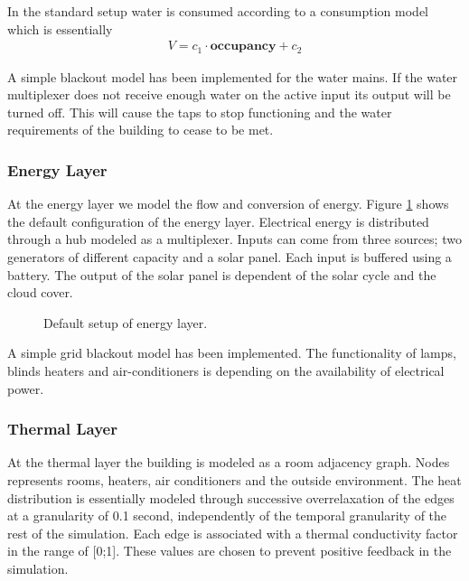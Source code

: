 \documentclass[10pt]{article}
\newcommand{\includeSVG}[1]{
  \texttt{[image: figs/\#1.pdf]}
}
\begin{document}
In the standard setup water is consumed according to a consumption model which is essentially
\begin{eqnarray}
  \nonumber V = c_1 \cdot \mathbf{occupancy} + c_2
\end{eqnarray}

A simple blackout model has been implemented for the water mains. If the water multiplexer does not receive enough water on the active input its output will be turned off. This will cause the taps to stop functioning and the water requirements of the building to cease to be met.

\subsubsection{Energy Layer}

At the energy layer we model the flow and conversion of energy. Figure \ref{fig:energy} shows the default configuration of the energy layer. Electrical energy is distributed through a hub modeled as a multiplexer. Inputs can come from three sources; two generators of different capacity and a solar panel. Each input is buffered using a battery.  The output of the solar panel is dependent of the solar cycle and the cloud cover.

\begin{figure}[htb]
  \begin{center}
    \rotatebox{0}{\scalebox{0.4}{\includeSVG{defaultenergy}}}
  \end{center}
  \caption{Default setup of energy layer.}
  \label{fig:energy}
\end{figure}

A simple grid blackout model has been implemented. The functionality of lamps, blinds heaters and air-conditioners is depending on the availability of electrical power.

\subsubsection{Thermal Layer}

At the thermal layer the building is modeled as a room adjacency graph. Nodes represents rooms, heaters, air conditioners and the outside environment. The heat distribution is essentially modeled through successive overrelaxation of the edges at a granularity of 0.1 second, independently of the temporal granularity of the rest of the simulation. Each edge is associated with a thermal conductivity factor in the range of [0;1]. These values are chosen to prevent positive feedback in the simulation.
\end{document}
